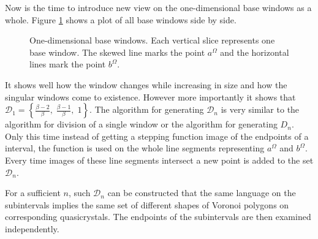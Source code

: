 \documentclass[text.tex]{subfiles}
\begin{document}
Now is the time to introduce new view on the one-dimensional base windows as a whole. Figure \ref{fig:allBaseWindows} shows a plot of all base windows side by side.

\begin{figure}[h]
\centering
{}
\caption{One-dimensional base windows. Each vertical slice represents one base window. The skewed line marks the point $a^\Omega$ and the horizontal lines mark the point $b^\Omega$.}
\label{fig:allBaseWindows}
\end{figure}

It shows well how the window changes while increasing in size and how the singular windows come to existence. However more importantly it shows that $\mathcal{D}_1 = \left\{\frac{\beta-2}{\beta},\; \frac{\beta-1}{\beta},\; 1\right\}$.
The algorithm for generating $\mathcal{D}_n$ is very similar to the algorithm for division of a single window or the algorithm for generating $D_n$. Only this time instead of getting a stepping function image of the endpoints of a interval, the function is used on the whole line segments representing $a^\Omega$ and $b^\Omega$. Every time images of these line segments intersect a new point is added to the set $\mathcal{D}_n$.

For a sufficient $n$, such $\mathcal{D}_n$ can be constructed that the same language on the subintervals implies the same set of different shapes of Voronoi polygons on corresponding quasicrystals. The endpoints of the subintervals are then examined independently. 
\end{document}
